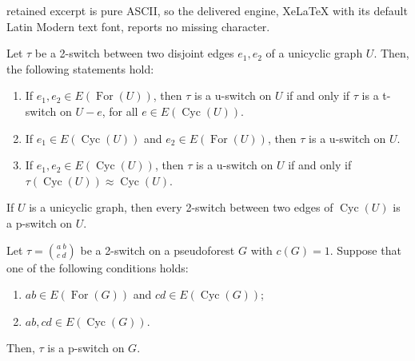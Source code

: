 \documentclass[10pt,a4paper]{amsart}
\newcommand{\Cycles}{\operatorname{Cyc}}
\newcommand{\Forest}{\operatorname{For}}
\begin{document}
retained excerpt is pure ASCII, so the delivered engine, XeLaTeX with its default Latin Modern text font, reports no missing character.
\begin{theorem}
	\label{uswitchcaract}
	Let $\tau$ be a 2-switch between two disjoint edges $e_{1}, e_{2}$ of a unicyclic graph $U$. Then, the following statements hold:
	\begin{enumerate}
		\item If $e_{1},e_{2}\in E(\Forest(U))$, then \(\tau\) is a u-switch on $U$ if and only if $\tau$ is a t-switch on $U-e$, for all $e\in E(\Cycles(U))$.

		\item If $e_{1}\in E(\Cycles(U))$ and $e_{2}\in E(\Forest(U))$, then \(\tau\) is a u-switch on $U$.

		\item If $e_{1},e_{2}\in E(\Cycles(U))$, then \(\tau\) is a u-switch on $U$ if and only if $\tau(\Cycles(U))\approx \Cycles(U)$.
	\end{enumerate}
\end{theorem}

\begin{lemma}
	\label{2switch.in.C_U=pswitch.in.U}
     If $U$ is a unicyclic graph, then every 2-switch between two edges of $\Cycles(U)$ is a p-switch on $U$.
\end{lemma}

\begin{lemma}
	\label{lema2switchpswitch}
	Let $\tau= {{a \ b}\choose{c \ d}}$ be a 2-switch on a pseudoforest $G$ with $c(G)=1$. Suppose that one of the following conditions holds:
	\begin{enumerate}
		\item $ab\in E(\Forest(G))$ and $cd\in E(\Cycles(G))$;

		\item $ab,cd\in E(\Cycles(G))$.
	\end{enumerate}
	Then, $\tau$ is a p-switch on $G$.
\end{lemma}
\end{document}

